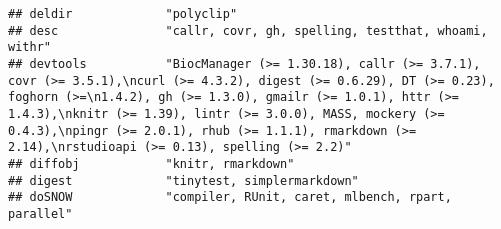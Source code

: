 \documentclass[
]{article}
\begin{document}
\begin{verbatim}
## deldir             "polyclip"                                                                                                                                                                                                                                                                                                                                                                                                                                                                        
## desc               "callr, covr, gh, spelling, testthat, whoami, withr"                                                                                                                                                                                                                                                                                                                                                                                                                              
## devtools           "BiocManager (>= 1.30.18), callr (>= 3.7.1), covr (>= 3.5.1),\ncurl (>= 4.3.2), digest (>= 0.6.29), DT (>= 0.23), foghorn (>=\n1.4.2), gh (>= 1.3.0), gmailr (>= 1.0.1), httr (>= 1.4.3),\nknitr (>= 1.39), lintr (>= 3.0.0), MASS, mockery (>= 0.4.3),\npingr (>= 2.0.1), rhub (>= 1.1.1), rmarkdown (>= 2.14),\nrstudioapi (>= 0.13), spelling (>= 2.2)"                                                                                                                        
## diffobj            "knitr, rmarkdown"                                                                                                                                                                                                                                                                                                                                                                                                                                                                
## digest             "tinytest, simplermarkdown"                                                                                                                                                                                                                                                                                                                                                                                                                                                       
## doSNOW             "compiler, RUnit, caret, mlbench, rpart, parallel"                                                                                                                                                                                                                                                                                                                                                                                                                                

\end{verbatim}
\end{document}
